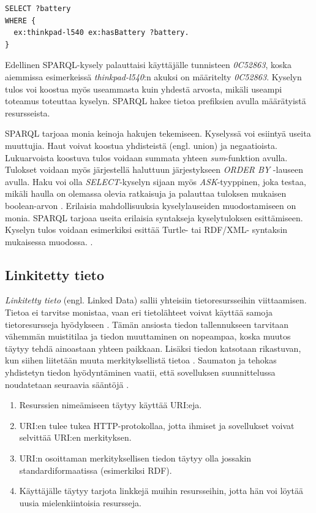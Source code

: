 \documentclass[finnish, 12pt, a4paper, elec, utf8, pdfa, online]{aaltothesis}
\begin{document}
{\begin{lstlisting}[style=codeblock,caption={SPARQL esimerkki.},captionpos=b,label={sparql_esim}]
SELECT ?battery
WHERE {
  ex:thinkpad-l540 ex:hasBattery ?battery.
}
\end{lstlisting}

Edellinen SPARQL-kysely palauttaisi käyttäjälle tunnisteen \textit{0C52863}, koska aiemmissa esimerkeissä \textit{thinkpad-l540}:n akuksi on määritelty \textit{0C52863}. Kyselyn tulos voi koostua myös useammasta kuin yhdestä arvosta, mikäli useampi toteamus toteuttaa kyselyn. SPARQL hakee tietoa prefiksien avulla määrätyistä resursseista.

SPARQL tarjoaa monia keinoja hakujen tekemiseen. Kyselyssä voi esiintyä useita muuttujia.
Haut voivat koostua yhdisteistä (engl. union) ja negaatioista. Lukuarvoista koostuva tulos voidaan summata yhteen \textit{sum}-funktion avulla. Tulokset voidaan myös järjestellä haluttuun järjestykseen \textit{ORDER BY} -lauseen avulla. Haku voi olla \textit{SELECT}-kyselyn sijaan myös \textit{ASK}-tyyppinen, joka testaa, mikäli haulla on olemassa olevia ratkaisuja ja palauttaa tuloksen mukaisen boolean-arvon \cite{sparql_query}. Erilaisia mahdollisuuksia kyselylauseiden muodostamiseen on monia. SPARQL tarjoaa useita erilaisia syntakseja kyselytuloksen esittämiseen. Kyselyn tulos voidaan esimerkiksi esittää Turtle- tai RDF/XML- syntaksin mukaisessa muodossa. \cite{W3C_turtle}.



\subsection{Linkitetty tieto}

\textit{Linkitetty tieto} (engl. Linked Data) sallii yhteisiin tietoresursseihin viittaamisen. Tietoa ei tarvitse monistaa, vaan eri tietolähteet voivat käyttää samoja tietoresursseja hyödykseen \cite{linked_data_finlad}. Tämän ansiosta tiedon tallennukseen tarvitaan vähemmän muistitilaa ja tiedon muuttaminen on nopeampaa, koska muutos täytyy tehdä ainoastaan yhteen paikkaan. Lisäksi tiedon katsotaan rikastuvan, kun siihen liitetään muuta merkityksellistä tietoa \cite{linked_data_finlad}. Saumaton ja tehokas yhdistetyn tiedon hyödyntäminen vaatii, että sovelluksen suunnittelussa noudatetaan seuraavia sääntöjä \cite{cambridge_linked} \cite{Tim-BL}.

\begin{enumerate}
\item Resurssien nimeämiseen täytyy käyttää URI:eja.
\item URI:en tulee tukea HTTP-protokollaa, jotta ihmiset ja sovellukset voivat selvittää URI:en merkityksen.
\item URI:n osoittaman merkityksellisen tiedon täytyy olla jossakin standardiformaatissa (esimerkiksi RDF).
\item Käyttäjälle täytyy tarjota linkkejä muihin resursseihin, jotta hän voi löytää uusia mielenkiintoisia resursseja.
\end{enumerate}
\vspace{0.5cm}

}
\end{document}
